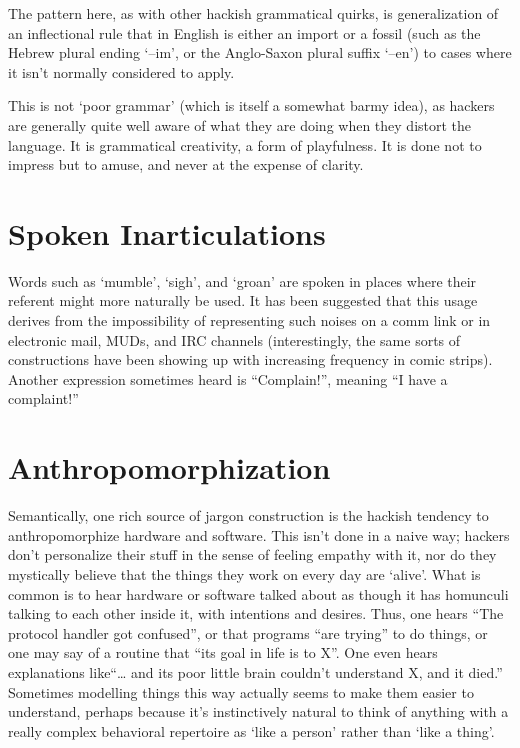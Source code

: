 	The pattern here, as with other hackish grammatical quirks, is generalization of an inflectional rule that in English is either an
	import or a fossil (such as the Hebrew plural ending `--im', or the Anglo-Saxon plural suffix `--en') to cases where it isn't normally
	considered to apply.

	This is not `poor grammar' (which is itself a somewhat barmy idea), as hackers are generally quite well aware of what they are doing
	when they distort the language. It is grammatical creativity, a form of playfulness. It is done not to impress but to amuse, and never
	at the expense of clarity.


\section*{Spoken Inarticulations}\label{Spoken-Inarticulations}

	Words such as `mumble', `sigh', and `groan' are spoken in places where their referent might more naturally be used. It has been
	suggested that this usage derives from the impossibility of representing such noises on a comm link or in electronic mail, MUDs, and
	IRC channels (interestingly, the same sorts of constructions have been showing up with increasing frequency in comic strips). Another
	expression sometimes heard is ``Complain!'', meaning ``I have a complaint!''


\section*{Anthropomorphization}\label{Anthropomorphization}

	Semantically, one rich source of jargon construction is the hackish tendency to anthropomorphize hardware and software. This isn't done
	in a naive way; hackers don't personalize their stuff in the sense of feeling empathy with it, nor do they mystically believe that the
	things they work on every day are `alive'. What is common is to hear hardware or software talked about as though it has homunculi
	talking to each other inside it, with intentions and desires. Thus, one hears ``The protocol handler got confused'', or that programs
	``are trying'' to do things, or one may say of a routine that ``its goal in life is to X''. One even hears explanations like``\dots
	and its poor little brain couldn't understand X, and it died.'' Sometimes modelling things this way actually seems to make them easier
	to understand, perhaps because it's instinctively natural to think of anything with a really complex behavioral repertoire as `like a
	person' rather than `like a thing'.


